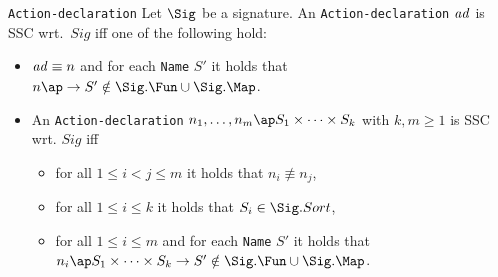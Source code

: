 \documentclass[twoside,fleqn,a4paper,dvips]{article}
\begin{document}
\begin{Dn-arg}{{\tt Action-declaration}}
Let $\Sig$ be a signature.
An {\tt Action-declaration} ${\it ad}$ is SSC wrt.\ $Sig$ iff one of the following
hold:
\begin{itemize}
\item
${\it ad}\equiv n$ and
for each {\tt Name} $S'$ it holds that $n\ap \rightarrow S' \notin
\Sig.\Fun\cup\Sig.\Map$.
\item
An {\tt Action-declaration} $n_1,\ldots,n_m\ap S_1\times \cdots \times
S_k$ with $k,m\geq 1$ is SSC wrt. $Sig$ iff
\begin{itemize}
\item
for all $1\leq i<j\leq m$ it holds that $n_i\not\equiv n_j$,
\item
for all $1\leq i\leq k$ it holds that $S_i\in \Sig.Sort$,
\item for all $1\leq i\leq m$ and for each
{\tt Name} $S'$
it holds that $n_i\ap S_1\times\cdots\times S_k\rightarrow S'\notin
\Sig.\Fun\cup\Sig.\Map$.
\end{itemize}
\end{itemize}
\end{Dn-arg}
\end{document}
